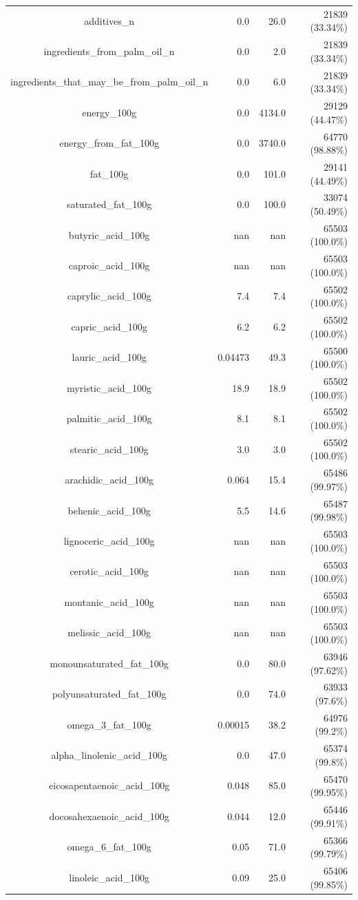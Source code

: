 \documentclass[11pt]{article}
\begin{document}
\begin{center}
\begin{longtable}{|c|r|r|r|}
additives\_n& 0.0& 26.0& 21839 (33.34\%)\\
ingredients\_from\_palm\_oil\_n& 0.0& 2.0& 21839 (33.34\%)\\
ingredients\_that\_may\_be\_from\_palm\_oil\_n& 0.0& 6.0& 21839 (33.34\%)\\
energy\_100g& 0.0& 4134.0& 29129 (44.47\%)\\
energy\_from\_fat\_100g& 0.0& 3740.0& 64770 (98.88\%)\\
fat\_100g& 0.0& 101.0& 29141 (44.49\%)\\
saturated\_fat\_100g& 0.0& 100.0& 33074 (50.49\%)\\
butyric\_acid\_100g& nan& nan& 65503 (100.0\%)\\
caproic\_acid\_100g& nan& nan& 65503 (100.0\%)\\
caprylic\_acid\_100g& 7.4& 7.4& 65502 (100.0\%)\\
capric\_acid\_100g& 6.2& 6.2& 65502 (100.0\%)\\
lauric\_acid\_100g& 0.04473& 49.3& 65500 (100.0\%)\\
myristic\_acid\_100g& 18.9& 18.9& 65502 (100.0\%)\\
palmitic\_acid\_100g& 8.1& 8.1& 65502 (100.0\%)\\
stearic\_acid\_100g& 3.0& 3.0& 65502 (100.0\%)\\
arachidic\_acid\_100g& 0.064& 15.4& 65486 (99.97\%)\\
behenic\_acid\_100g& 5.5& 14.6& 65487 (99.98\%)\\
lignoceric\_acid\_100g& nan& nan& 65503 (100.0\%)\\
cerotic\_acid\_100g& nan& nan& 65503 (100.0\%)\\
montanic\_acid\_100g& nan& nan& 65503 (100.0\%)\\
melissic\_acid\_100g& nan& nan& 65503 (100.0\%)\\
monounsaturated\_fat\_100g& 0.0& 80.0& 63946 (97.62\%)\\
polyunsaturated\_fat\_100g& 0.0& 74.0& 63933 (97.6\%)\\
omega\_3\_fat\_100g& 0.00015& 38.2& 64976 (99.2\%)\\
alpha\_linolenic\_acid\_100g& 0.0& 47.0& 65374 (99.8\%)\\
eicosapentaenoic\_acid\_100g& 0.048& 85.0& 65470 (99.95\%)\\
docosahexaenoic\_acid\_100g& 0.044& 12.0& 65446 (99.91\%)\\
omega\_6\_fat\_100g& 0.05& 71.0& 65366 (99.79\%)\\
linoleic\_acid\_100g& 0.09& 25.0& 65406 (99.85\%)\\

\end{longtable}
\end{center}
\end{document}
